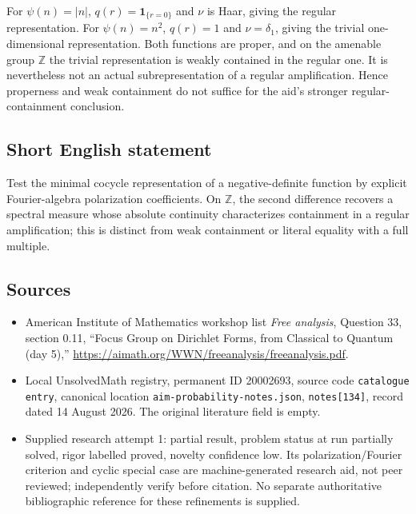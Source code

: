 \documentclass[11pt]{article}
\newcommand{\Z}{\mathbb{Z}}
\begin{document}
For $\psi(n)=|n|$, $q(r)=\mathbf1_{\{r=0\}}$ and $\nu$ is Haar, giving the regular representation. For $\psi(n)=n^2$, $q(r)=1$ and $\nu=\delta_1$, giving the trivial one-dimensional representation. Both functions are proper, and on the amenable group $\Z$ the trivial representation is weakly contained in the regular one. It is nevertheless not an actual subrepresentation of a regular amplification. Hence properness and weak containment do not suffice for the aid's stronger regular-containment conclusion.
\subsection{Short English statement}
Test the minimal cocycle representation of a negative-definite function by explicit Fourier-algebra polarization coefficients. On $\Z$, the second difference recovers a spectral measure whose absolute continuity characterizes containment in a regular amplification; this is distinct from weak containment or literal equality with a full multiple.
\subsection{Sources}
\begin{itemize}
\item American Institute of Mathematics workshop list \emph{Free analysis}, Question 33, section 0.11, ``Focus Group on Dirichlet Forms, from Classical to Quantum (day 5),'' \url{https://aimath.org/WWN/freeanalysis/freeanalysis.pdf}.
\item Local UnsolvedMath registry, permanent ID 20002693, source code \texttt{catalogue entry}, canonical location \texttt{aim-probability-notes.json}, \texttt{notes[134]}, record dated 14 August 2026. The original literature field is empty.
\item Supplied research attempt 1: partial result, problem status at run partially solved, rigor labelled proved, novelty confidence low. Its polarization/Fourier criterion and cyclic special case are machine-generated research aid, not peer reviewed; independently verify before citation. No separate authoritative bibliographic reference for these refinements is supplied.
\end{itemize}
\end{document}
